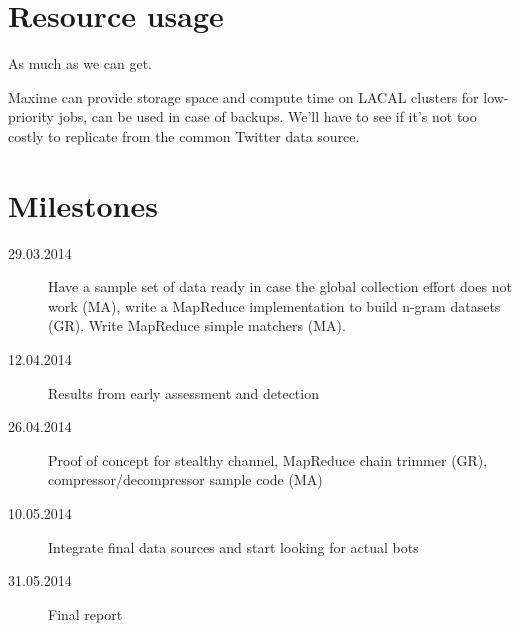 \documentclass[a4paper,11pt]{article}
\begin{document}
\section{Resource usage}

As much as we can get.

Maxime can provide storage space and compute time on LACAL clusters for low-priority jobs, can be used in case of backups. We'll have to see if it's not too costly to replicate from the common Twitter data source.

\section{Milestones}

\begin{description}
	\item[29.03.2014] Have a sample set of data ready in case the global collection effort does not work (MA), write a MapReduce implementation to build n-gram datasets (GR). Write MapReduce simple matchers (MA).
	\item[12.04.2014] Results from early assessment and detection
	\item[26.04.2014] Proof of concept for stealthy channel, MapReduce chain trimmer (GR), compressor/decompressor sample code (MA)
	\item[10.05.2014] Integrate final data sources and start looking for actual bots
	\item[31.05.2014] Final report 
\end{description}
\end{document}
